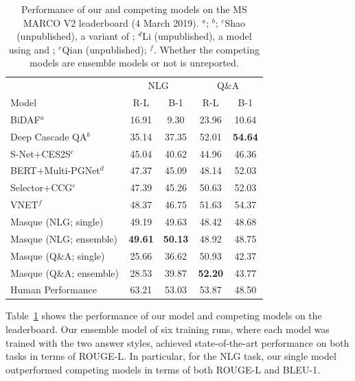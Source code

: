 \documentclass[11pt,a4paper]{article}
\theoremstyle{mydef}
\theoremstyle{myprob}
\begin{document}
\begin{table}
\centering
{\small \tabcolsep=4pt
\begin{tabular}{l|cc|cc}
\hline
 & \multicolumn{2}{c|}{NLG} & \multicolumn{2}{c}{Q\&A}\\ %
Model & R-L & B-1 & R-L & B-1\\ \hline
BiDAF$^a$ & 16.91 & 9.30 & 23.96 & 10.64 \\
Deep Cascade QA$^b$ & 35.14 & 37.35 &  52.01 & {\bf 54.64}\\ 
S-Net+CES2S$^c$ & 45.04 & 40.62 & 44.96 & 46.36\\
BERT+Multi-PGNet$^d$ & 47.37 & 45.09 & 48.14 & 52.03  \\
Selector+CCG$^e$ & 47.39 & 45.26 & 50.63 &52.03 \\ 
VNET$^f$ & 48.37 & 46.75 & 51.63 & 54.37\\ \hline
Masque (NLG; single) & 49.19 &  49.63 & 48.42 & 48.68\\
Masque (NLG; ensemble) & {\bf 49.61} & {\bf 50.13} & 48.92& 48.75 \\
\hline
Masque (Q\&A; single) & 25.66 & 36.62 & 50.93 & 42.37\\ 
Masque (Q\&A; ensemble) & 28.53 & 39.87 & {\bf 52.20} & 43.77 \\ 
\hline
Human Performance & 63.21 & 53.03  & 53.87 & 48.50\\
\hline
\end{tabular}
}
\caption{Performance of our and competing models on the MS MARCO V2 leaderboard 
(4 March 2019). 
$^a$\citet{SeoKFH17}; $^b$\citet{YanAAAI19};
$^c$Shao (unpublished), a variant of \citet{TanWYDLZ18};
$^d$Li (unpublished), a model using \citet{DevlinCLT18} and \citet{SeeLM17};
$^e$Qian (unpublished); 
$^f$\citet{WuWLHWLLL18}.
Whether the competing models are ensemble models or not is unreported. }

\label{tb:nlg-leaderboard}
\end{table}


Table~\ref{tb:nlg-leaderboard} shows the performance of our model and competing models on the leaderboard.
Our ensemble model of six training runs, where each model was trained with the two answer styles,
achieved state-of-the-art performance on both tasks in terms of ROUGE-L. 
In particular, for the NLG task, our single model outperformed competing models in terms of both ROUGE-L and BLEU-1.
\end{document}
